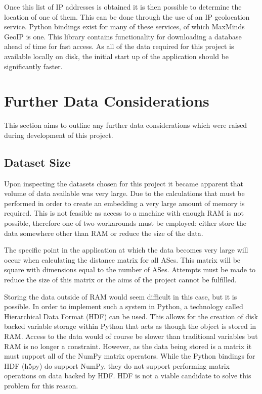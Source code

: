 Once this list of IP addresses is obtained it is then possible to determine the location of one of them. This can be done through the use of an IP geolocation service. Python bindings exist for many of these services, of which MaxMinds GeoIP \cite{python_geoip_2014} is one. This library contains functionality for downloading a database ahead of time for fast access. As all of the data required for this project is available locally on disk, the initial start up of the application should be significantly faster. 

\section{Further Data Considerations}

This section aims to outline any further data considerations which were raised during development of this project.

\subsection{Dataset Size}
\label{sec:dataset_size}

Upon inspecting the datasets chosen for this project it became apparent that volume of data available was very large. Due to the calculations that must be performed in order to create an embedding a very large amount of memory is required. This is not feasible as access to a machine with enough RAM is not possible, therefore one of two workarounds must be employed: either store the data somewhere other than RAM or reduce the size of the data. 

The specific point in the application at which the data becomes very large will occur when calculating the distance matrix for all ASes. This matrix will be square with dimensions equal to the number of ASes. Attempts must be made to reduce the size of this matrix or the aims of the project cannot be fulfilled.

Storing the data outside of RAM would seem difficult in this case, but it is possible. In order to implement such a system in Python, a technology called Hierarchical Data Format (HDF) can be used. This allows for the creation of disk backed variable storage within Python that acts as though the object is stored in RAM. Access to the data would of course be slower than traditional variables but RAM is no longer a constraint. However, as the data being stored is a matrix it must support all of the NumPy matrix operators. While the Python bindings for HDF (h5py) do support NumPy, they do not support performing matrix operations on data backed by HDF. HDF is not a viable candidate to solve this problem for this reason.

